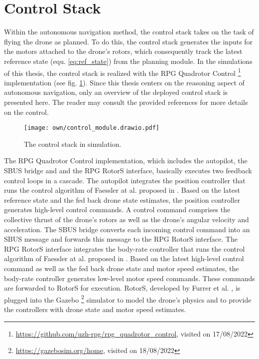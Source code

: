 \section{Control Stack} \label{sec:control_stack}
Within the autonomous navigation method, 
the control stack takes on the task of 
flying the drone as planned.
To do this, the control stack
generates the inputs for the motors attached to the drone's rotors,
which consequently track the latest reference state
(equ. \ref{eq:ref_state})
from the planning module.
In the simulations of this thesis,
the control stack is realized with the RPG Quadrotor Control \footnote{
        \url{https://github.com/uzh-rpg/rpg_quadrotor_control}, visited on 17/08/2022
} implementation
(see fig. \ref{fig:control_module}).
Since this thesis centers on the reasoning aspect of autonomous navigation, 
only an overview of the deployed control stack is presented here.
The reader may consult the provided references for more details
on the control.

\begin{figure}
    \centering
    \texttt{[image: own/control\_module.drawio.pdf]}
    \caption[
        The control stack in simulation.
    ]{
        The control stack in simulation.
        \label{fig:control_module}}
\end{figure}

The RPG Quadrotor Control implementation,
which includes the autopilot, the SBUS bridge and and the RPG RotorS interface,
basically executes two feedback control loops in a cascade.
The autopilot integrates the position controller 
that runs the control algorithm of Faessler at al. proposed in \cite{Faessler2018}.
Based on the latest reference state and the fed back drone state estimates,
the position controller generates high-level control commands.
A control command comprises 
the collective thrust of the drone's rotors 
as well as the drone's angular velocity and acceleration.
The SBUS bridge converts each incoming control command
into an SBUS message and forwards this message to the
RPG RotorS interface.
The RPG RotorS interface integrates the body-rate controller
that runs the control algorithm of Faessler at al. proposed in \cite{Faessler2017}.
Based on the latest high-level control command 
as well as the fed back drone state and motor speed estimates,
the body-rate controller generates low-level motor speed commands.
These commands are forwarded to RotorS for execution.
RotorS, developed by Furrer et al. \cite{Furrer2016},
is plugged into the Gazebo \footnote{
    \url{https://gazebosim.org/home}, visited on 18/08/2022
}
simulator to model the drone's physics 
and to provide the controllers with
drone state and motor speed estimates.

